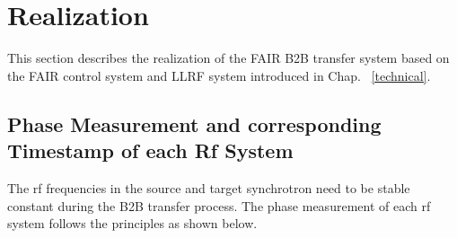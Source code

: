 %
% 
\section{Realization}
This section describes the realization of the FAIR B2B transfer system based on the FAIR control system and LLRF system introduced in Chap. ~\ref{technical}.
%
\subsection{Phase Measurement and corresponding Timestamp of each Rf System}
The rf frequencies in the source and target synchrotron need to be stable constant during the B2B transfer process. The phase measurement of each rf system follows the principles as shown below.


